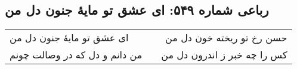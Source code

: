 \begin{center}
\section*{رباعی شماره ۵۴۹: ای عشق تو مایهٔ جنون دل من}
\label{sec:sh549}
\begin{longtable}{l p{0.5cm} r}
ای عشق تو مایهٔ جنون دل من
&&
حسن رخ تو ریخته خون دل من
\\
من دانم و دل که در وصالت چونم
&&
کس را چه خبر ز اندرون دل من
\\
\end{longtable}
\end{center}
